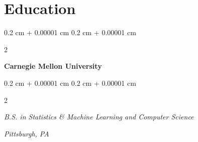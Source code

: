 \documentclass[10pt, letterpaper]{article}
\newenvironment{highlightsforbulletentries}{
    \begin{itemize}[
        topsep=0.10 cm,
        parsep=0.10 cm,
        partopsep=0pt,
        itemsep=0pt,
        leftmargin=10pt
    ]
}{
    \end{itemize}
} %
\newenvironment{onecolentry}{
    \begin{adjustwidth}{
        0.2 cm + 0.00001 cm
    }{
        0.2 cm + 0.00001 cm
    }
}{
    \end{adjustwidth}
} %
\newenvironment{twocolentry}[2][]{
    \onecolentry
    \def\secondColumn{#2}
    \setcolumnwidth{\fill, 4.5 cm}
    \begin{paracol}{2}
}{
    \switchcolumn \raggedleft \secondColumn
    \end{paracol}
    \endonecolentry
} %
\let\hrefWithoutArrow\href
\renewcommand{\href}[2]{\hrefWithoutArrow{#1}{\ifthenelse{\equal{#2}{}}{ }{#2 }\raisebox{.15ex}{\footnotesize \faExternalLink*}}}
\begin{document}

    








    \section{Education}

        \begin{twocolentry}{
        }
            \textbf{Carnegie Mellon University}
        \end{twocolentry}
        \begin{twocolentry}{
            \textit{Pittsburgh, PA}}
            \textit{B.S. in Statistics \& Machine Learning and Computer Science}
        \end{twocolentry}
        
\end{document}
